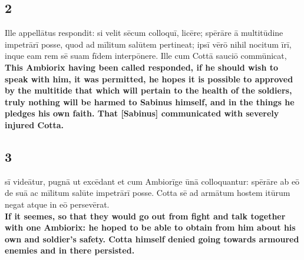 \documentclass{article}
\begin{document}
\subsection*{2}
Ille appellātus respondit: si velit sēcum colloquī, licēre; spērāre ā multitūdine impetrārī posse, quod ad mīlitum salūtem pertineat; ipsī vērō nihil nocitum īrī, inque eam rem sē suam fīdem interpōnere. Ille cum Cottā sauciō commūnicat,  \\ 
\textbf{This Ambiorix having been called responded, if he should wish to speak with him, it was permitted, he hopes it is possible to approved by the multitide that which will pertain to the health of the soldiers, truly nothing will be harmed to Sabinus himself, and in the things he pledges his own faith. That [Sabinus] communicated with severely injured Cotta.}

\subsection*{3}
sī videātur, pugnā ut excēdant et cum Ambiorīge ūnā colloquantur: spērāre ab eō de suā ac mīlitum salūte impetrārī posse. Cotta sē ad armātum hostem itūrum negat atque in eō persevērat. \\ 
\textbf{If it seemes, so that they would go out from fight and talk together with one Ambiorix: he hoped to be able to obtain from him about his own and soldier's safety. Cotta himself denied going towards armoured enemies and in there persisted.}
\end{document}
